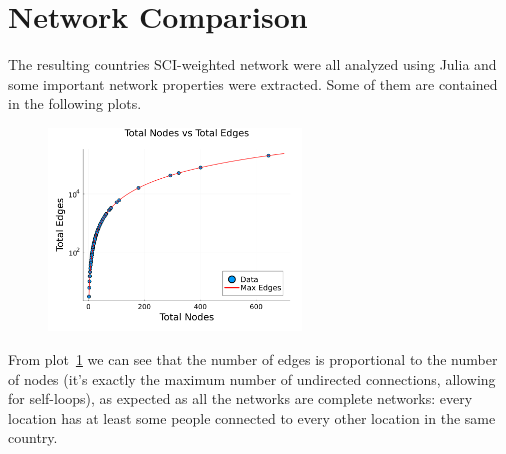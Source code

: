 \section{Network Comparison}
The resulting countries SCI-weighted network were all analyzed using Julia and some important network properties were extracted. Some of them are contained in the following plots.

\begin{figure}[H]
    \centering
    \includegraphics[width=0.6\textwidth]{images/task44/TotalNodesVsTotalEdges.png}
    \caption{}
    \label{fig:TotalNodesVsTotalEdges}
\end{figure}

From plot~\ref{fig:TotalNodesVsTotalEdges} we can see that the number of edges is proportional to the number of nodes (it's exactly the maximum number of undirected connections, allowing for self-loops), as expected as all the networks are complete networks: every location has at least some people connected to every other location in the same country.

